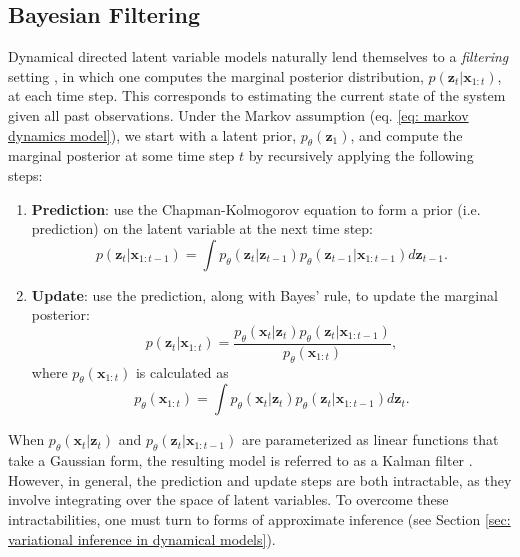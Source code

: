 \subsection{Bayesian Filtering}

Dynamical directed latent variable models naturally lend themselves to a \textit{filtering} setting \cite{sarkka2013bayesian}, in which one computes the marginal posterior distribution, $p(\mathbf{z}_t | \mathbf{x}_{1:t})$, at each time step. This corresponds to estimating the current state of the system given all past observations. Under the Markov assumption (eq. \ref{eq: markov dynamics model}), we start with a latent prior, $p_\theta (\mathbf{z}_1)$, and compute the marginal posterior at some time step $t$ by recursively applying the following steps:
\begin{enumerate}
	\item \textbf{Prediction}: use the Chapman-Kolmogorov equation to form a prior (i.e. prediction) on the latent variable at the next time step: 
\begin{equation}
	p(\mathbf{z}_t | \mathbf{x}_{1:t-1}) = \int p_\theta (\mathbf{z}_t | \mathbf{z}_{t-1}) p_\theta (\mathbf{z}_{t-1} | \mathbf{x}_{1:t-1}) d\mathbf{z}_{t-1}.
\end{equation}
	\item \textbf{Update}: use the prediction, along with Bayes' rule, to update the marginal posterior:
\begin{equation}
	p(\mathbf{z}_t | \mathbf{x}_{1:t}) = \frac{p_\theta (\mathbf{x}_t | \mathbf{z}_t) p_\theta (\mathbf{z}_t | \mathbf{x}_{1:t-1})}{p_\theta (\mathbf{x}_{1:t})},
\end{equation}
	where $p_\theta (\mathbf{x}_{1:t})$ is calculated as
\begin{equation}
	p_\theta (\mathbf{x}_{1:t}) = \int p_\theta (\mathbf{x}_t | \mathbf{z}_t) p_\theta (\mathbf{z}_t | \mathbf{x}_{1:t-1}) d\mathbf{z}_t.
\end{equation}
\end{enumerate}
When $p_\theta (\mathbf{x}_t | \mathbf{z}_t)$ and $p_\theta (\mathbf{z}_t | \mathbf{x}_{1:t-1})$ are parameterized as linear functions that take a Gaussian form, the resulting model is referred to as a Kalman filter \cite{kalman1961new}. However, in general, the prediction and update steps are both intractable, as they involve integrating over the space of latent variables. To overcome these intractabilities, one must turn to forms of approximate inference (see Section \ref{sec: variational inference in dynamical models}).


